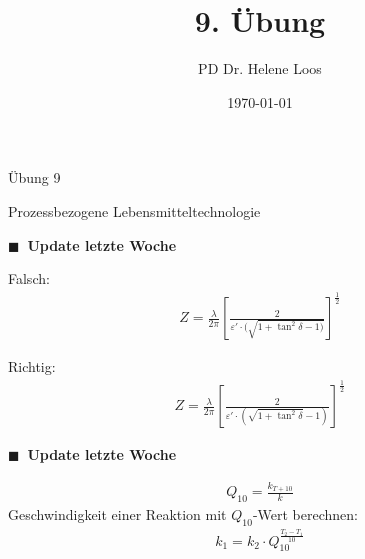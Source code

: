 \documentclass[aspectratio=169,9pt]{beamer}
\title{9. Übung}
\author{PD Dr. Helene Loos}
\date{\today}
\begin{document}
\small



\begin{frame}
\begin{center}

\LARGE Übung 9  \par \normalsize
Prozessbezogene Lebensmitteltechnologie
\end{center}
\small
\end{frame}


\begin{frame}


{\color{miugray}$\blacksquare ~$} \textbf{Update letzte Woche} \par \vspace*{2mm}


Falsch:
\begin{align*}
Z = \frac{\lambda}{2 \pi} \left[ \frac{2}{\varepsilon ' \cdot (\sqrt{1+ \tan^2 \delta- 1)} } \right]^{\frac{1}{2}}
\end{align*}

Richtig:
\begin{align*}
Z = \frac{\lambda}{2 \pi} \left[ \frac{2}{\varepsilon ' \cdot (\sqrt{1+ \tan^2 \delta} - 1)} \right]^{\frac{1}{2}}
\end{align*}

\end{frame}











\begin{frame}



{\color{miugray}$\blacksquare ~$} \textbf{Update letzte Woche} \par \vspace*{2mm}


\begin{align*}
Q_{10} = \frac{k_{T+10}}{k}
\end{align*}
Geschwindigkeit einer Reaktion mit $Q_{10}$-Wert berechnen:
\begin{align*}
k_1 = k_2 \cdot Q_{10}^{\frac{T_2-T_1}{10}}
\end{align*}


\end{frame}
\end{document}
